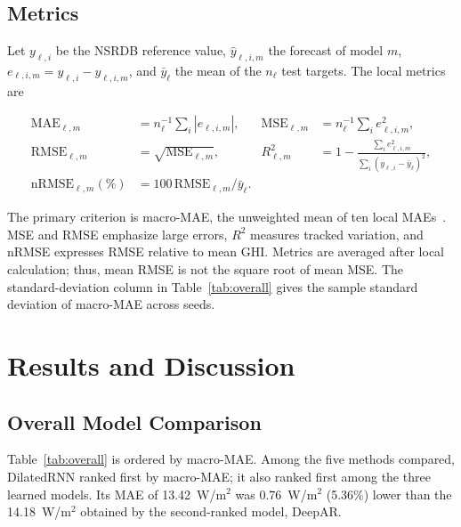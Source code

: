 \documentclass[runningheads]{llncs}
\begin{document}
\subsection{Metrics}

Let $y_{\ell,i}$ be the NSRDB reference value, $\widehat y_{\ell,i,m}$ the forecast of model $m$, $e_{\ell,i,m}=y_{\ell,i}-\widehat y_{\ell,i,m}$, and $\bar y_\ell$ the mean of the $n_\ell$ test targets. The local metrics are

\begin{equation}
\begin{aligned}
 \mathrm{MAE}_{\ell,m}&=n_\ell^{-1}\sum_i|e_{\ell,i,m}|, &
 \mathrm{MSE}_{\ell,m}&=n_\ell^{-1}\sum_i e_{\ell,i,m}^2,\\
 \mathrm{RMSE}_{\ell,m}&=\sqrt{\mathrm{MSE}_{\ell,m}}, &
 R^2_{\ell,m}&=1-\frac{\sum_i e_{\ell,i,m}^2}{\sum_i(y_{\ell,i}-\bar y_\ell)^2},\\
 \mathrm{nRMSE}_{\ell,m}(\%)&=100\,\mathrm{RMSE}_{\ell,m}/\bar y_\ell. &&
\end{aligned}
\label{eq:metrics}
\end{equation}

The primary criterion is macro-MAE, the unweighted mean of ten local MAEs~\cite{hyndman2006}. MSE and RMSE emphasize large errors, $R^2$ measures tracked variation, and nRMSE expresses RMSE relative to mean GHI. Metrics are averaged after local calculation; thus, mean RMSE is not the square root of mean MSE. The standard-deviation column in Table~\ref{tab:overall} gives the sample standard deviation of macro-MAE across seeds.

\section{Results and Discussion}
\label{sec:results}

\subsection{Overall Model Comparison}

Table~\ref{tab:overall} is ordered by macro-MAE. Among the five methods compared, DilatedRNN ranked first by macro-MAE; it also ranked first among the three learned models. Its MAE of 13.42~W/m$^2$ was 0.76~W/m$^2$ (5.36\%) lower than the 14.18~W/m$^2$ obtained by the second-ranked model, DeepAR.
\end{document}
